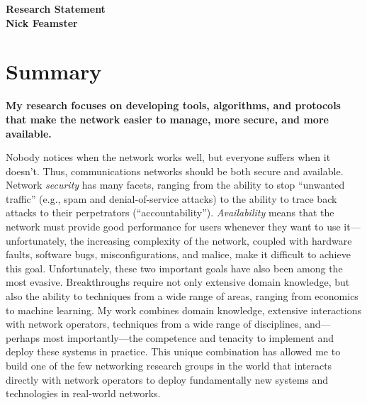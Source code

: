 \newpage \setcounter{page}{1}


\begin{center}
{\Large\textbf{Research Statement}}\\[0.1in] {\large\textbf{Nick
Feamster}}\\
\end{center}

\section*{Summary}

{\bf My research focuses on developing tools, algorithms, and protocols
that make the network easier to manage, more secure, and more
available.}

Nobody notices when the network works well, but everyone suffers when it
doesn't.  Thus, communications networks should be both secure and
available.  Network {\em security} has many facets, ranging from the
ability to stop ``unwanted traffic'' (e.g., spam and denial-of-service
attacks) to the ability to trace back attacks to their perpetrators
(``accountability'').  {\em Availability} means that the network must
provide good performance for users whenever they want to use
it---unfortunately, the increasing complexity of the network, coupled
with hardware faults, software bugs, misconfigurations, and malice, make
it difficult to achieve this goal.  Unfortunately, these two important
goals have also been among the most evasive.  Breakthroughs require not
only extensive domain knowledge, but also the ability to techniques from
a wide range of areas, ranging from economics to machine learning.  My
work combines domain knowledge, extensive interactions with network
operators, techniques from a wide range of disciplines, and---perhaps
most importantly---the competence and tenacity to implement and deploy
these systems in practice.  This unique combination has allowed me to
build one of the few networking research groups in the world that
interacts directly with network operators to deploy fundamentally new
systems and technologies in real-world networks.

